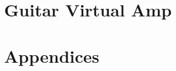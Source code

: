 \documentclass[11pt]{article}
\begin{document}
\part{Guitar Virtual Amp}





\appendix
\part*{Appendices}





\end{document}
